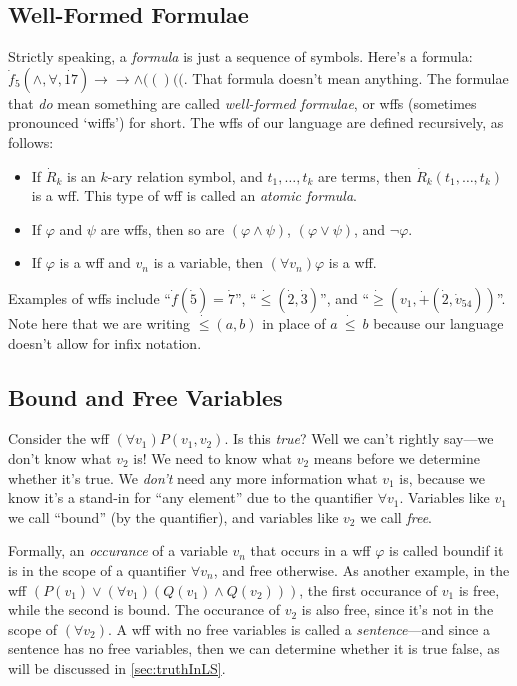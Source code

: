 \subsection{Well-Formed Formulae}
Strictly speaking, a \textit{formula} is just a sequence of symbols. Here's a formula: $\dot f_5 (\land, \forall, \dot{17})\to\to\land (()(($. That formula doesn't mean anything. The formulae that \textit{do} mean something are called \textit{well-formed formulae}, or wffs (sometimes pronounced `wiffs') for short. The wffs of our language are defined recursively, as follows:
\begin{itemize}
    \item If $\dot R_k$ is an $k$-ary relation symbol, and $t_1, \ldots, t_k$ are terms, then $\dot R_k(t_1, \ldots, t_k)$ is a wff. This type of wff is called an \textit{atomic formula}. 
    \item If $\varphi$ and $\psi$ are wffs, then so are $(\varphi \land \psi)$, $(\varphi \lor \psi)$, and $\neg \varphi$. 
    \item If $\varphi$ is a wff and $v_n$ is a variable, then $(\forall v_n) \varphi$ is a wff.
\end{itemize}

Examples of wffs include ``$\dot f (\dot 5) = \dot 7$'', ``$\dot \leq (\dot 2, \dot 3)$'', and ``$\dot \geq (v_1, \dot +(\dot 2, \dot v_{54}))$''. Note here that we are writing $\dot \leq (a, b)$ in place of $a\  \dot \leq \ b$ because our language doesn't allow for infix notation.

\subsection{Bound and Free Variables}
Consider the wff $(\forall v_1) P(v_1, v_2)$. Is this \textit{true}? Well we can't rightly say---we don't know what $v_2$ is! We need to know what $v_2$ means before we determine whether it's true. We \textit{don't} need any more information what $v_1$ is, because we know it's a stand-in for ``any element'' due to the quantifier $\forall v_1$. Variables like $v_1$ we call ``bound'' (by the quantifier), and variables like $v_2$ we call \textit{free}. 

Formally, an \textit{occurance} of a variable $v_n$ that occurs in a wff $\varphi$ is called boundif it is in the scope of a quantifier $\forall v_n$, and free otherwise. As another example, in the wff $(P(v_1) \lor (\forall v_1) (Q(v_1) \land Q(v_2)))$, the first occurance of $v_1$ is free, while the second is bound. The occurance of $v_2$ is also free, since it's not in the scope of $(\forall v_2)$. A wff with no free variables is called a \textit{sentence}---and since a sentence has no free variables, then we can determine whether it is true false, as will be discussed in \autoref{sec:truthInLS}.

